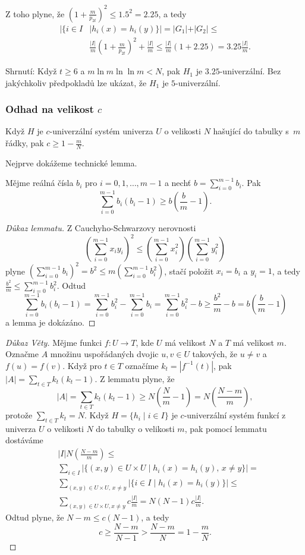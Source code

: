 \documentclass[a4paper,12pt]{article}
\begin{document}
Z toho plyne, že $(1+\frac m{p_{2t}})^2\le 1.5^2=2.2
5$, a tedy 
\begin{align*}|\{i\in I&\mid h_i(x)=h_i(y)\}|=|G_1|+|G_2|\le\\
&\frac {|I|}m(1+\frac m{p_{2t}})^2+\frac {|I|}m\le\frac {|I|}m(1+
2.25)=3.25\frac {|I|}m.\end{align*}

Shrnutí: Když $t\ge 6$ a $m\ln m\ln\ln m<N$, pak $
H_1$ je 
$3.25$-univerzální. Bez jakýchkoliv předpokladů lze 
ukázat, že $H_1$ je $5$-univerzální.

\subsubsection{Odhad na velikost $c$}

\begin{veta}Když $H$ je $c$-univerzální 
systém univerza $U$ o velikosti $N$ hašující do tabulky s~$
m$ řádky, 
pak $c\ge 1-\frac mN$.
\end{veta}

Nejprve dokážeme technické lemma.

\begin{lemma}Mějme reálná čísla $b_i$ pro $i=0,1
,\dots,m-1$ a 
nechť $b=\sum_{i=0}^{m-1}b_i$. Pak 
$$\sum_{i=0}^{m-1}b_i(b_i-1)\ge b(\frac bm-1).$$
\end{lemma}

\begin{proof}[Důkaz lemmatu]Z Cauchyho-Schwarzovy nerovnosti 
$$(\sum_{i=0}^{m-1}x_iy_i)^2\le (\sum_{i=0}^{m-1}x^2_i)(\sum_{i=0}^{
m-1}y_i^2)$$
plyne $(\sum_{i=0}^{m-1}b_i)^2=b^2\le m(\sum_{i=0}^{m-1}b_i^2)$, stačí položit 
$x_i=b_i$ a $y_i=1$, a tedy $\frac {b^2}m\le\sum_{i=0}^{m-1}b_i^2$. Odtud
$$\sum_{i=0}^{m-1}b_i(b_i-1)=\sum_{i=0}^{m-1}b_i^2-\sum_{i=0}^{m-
1}b_i=\sum_{i=0}^{m-1}b_i^2-b\ge\frac {b^2}m-b=b(\frac bm-1)$$
a lemma je dokázáno.
\end{proof}

\begin{proof}[Důkaz Věty]Mějme funkci $f:U\to T$, kde $U$ má 
velikost $N$ a $T$ má velikost $m$. Označme $A$ množinu 
uspořádaných dvojic $u,v\in U$ takových, že $u\ne v$ a $
f(u)=f(v)$.
Když pro $t\in T$ označíme $k_t=|f^{-1}(t)|$, pak $|A|=
\sum_{t\in T}k_t(k_t-1)$.
Z lemmatu plyne, že 
$$|A|=\sum_{t\in T}k_t(k_t-1)\ge N(\frac Nm-1)=N(\frac {N-m}m),$$
protože $\sum_{t\in T}k_t=N$.\newline 
Když $H=\{h_i\mid i\in I\}$ je $c$-univerzální systém funkcí z univerza $
U$ o 
velikosti $N$ do tabulky o velikosti $m$, pak pomocí 
lemmatu dostáváme 
\begin{align*}&|I|N(\frac {N-m}m)\le\\
&\sum_{i\in I}|\{(x,y)\in U\times U\mid h_i(x)=h_i(y),\,x\ne y\}|
=\\
&\sum_{(x,y)\in U\times U,\,x\ne y}|\{i\in I\mid h_i(x)=h_i(y)\}|
\le\\
&\sum_{(x,y)\in U\times U,x\ne y}c\frac {|I|}m=N(N-1)c\frac {|I|}
m.\end{align*}
Odtud plyne, že $N-m\le c(N-1)$, a tedy 
$$c\ge\frac {N-m}{N-1}>\frac {N-m}N=1-\frac mN.$$
\end{proof}
\end{document}
